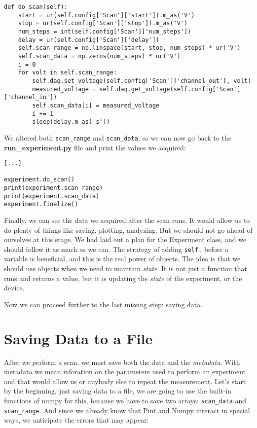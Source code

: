 \begin{verbatim}
def do_scan(self):
    start = ur(self.config['Scan']['start']).m_as('V')
    stop = ur(self.config['Scan']['stop']).m_as('V')
    num_steps = int(self.config['Scan']['num_steps'])
    delay = ur(self.config['Scan']['delay'])
    self.scan_range = np.linspace(start, stop, num_steps) * ur('V')
    self.scan_data = np.zeros(num_steps) * ur('V')
    i = 0
    for volt in self.scan_range:
        self.daq.set_voltage(self.config['Scan']['channel_out'], volt)
        measured_voltage = self.daq.get_voltage(self.config['Scan']['channel_in'])
        self.scan_data[i] = measured_voltage
        i += 1
        sleep(delay.m_as('s'))
\end{verbatim}

We altered both \texttt{scan\_range} and \texttt{scan\_data}, so we can now go back to the \textbf{run\_experiment.py} file and print the values we acquired:

\begin{verbatim}
[...]

experiment.do_scan()
print(experiment.scan_range)
print(experiment.scan_data)
experiment.finalize()
\end{verbatim}

Finally, we can see the data we acquired after the scan runs. It would allow us to do plenty of things like saving, plotting, analyzing. But we should not go ahead of ourselves at this stage. We had laid out a plan for the Experiment class, and we should follow it as much as we can. The strategy of adding \texttt{self.} before a variable is beneficial, and this is the real power of objects. The idea is that we should use objects when we need to maintain \emph{state}. It is not just a function that runs and returns a value, but it is updating the \emph{state} of the experiment, or the device.

Now we can proceed further to the last missing step: saving data.

\section{Saving Data to a File}\label{sec:saving-data}
After we perform a scan, we must save both the data and the \emph{metadata}. With metadata we mean inforation on the parameters used to perform an experiment and that would allow us or anybody else to repeat the measurement. Let's start by the beginning, just saving data to a file, we are going to use the built-in functions of numpy for this, because we have to save two arrays: \texttt{scan\_data} and \texttt{scan\_range}. And since we already know that Pint and Numpy interact in special ways, we anticipate the errors that may appear:


